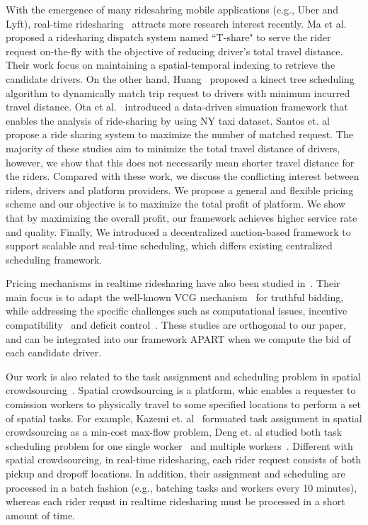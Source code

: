 With the emergence of many ridesahring mobile applications (e.g., Uber and Lyft), real-time ridesharing~\cite{Ma13, Ma15, Huang14,Ota15, Cici15, Cao15, PelzerITS15} attracts more research interest recently. Ma et al.~\cite{Ma13, Ma15} proposed a ridesharing dispatch system named ``T-share" to serve the rider request on-the-fly with the objective of reducing driver's total travel distance. Their work focus on maintaining a spatial-temporal indexing to retrieve the candidate drivers. On the other hand, Huang~\cite{Huang14} proposed a kinect tree scheduling algorithm to dynamically match trip request to drivers with minimum incurred travel distance. Ota et al.~\cite{Ota15} introduced a data-driven simuation framework that enables the analysis of ride-sharing by using NY taxi dataset. Santos et. al~\cite{SantosIjcai13} propose a ride sharing system to maximize the number of matched request. The majority of these studies aim to minimize the total travel distance of drivers, however, we show that this does not necessarily mean shorter travel distance for the riders. Compared with these work, we discuss the conflicting interest between riders, drivers and platform providers. We propose a general and flexible pricing scheme and  our objective is to maximize the total profit of platform. We show that by maximizing the overall profit, our framework achieves higher service rate and quality.  Finally, We introduced a decentralized auction-based framework to support scalable and real-time scheduling, which differs existing centralized scheduling framework. 

Pricing mechanisms in realtime ridesharing have also been studied in~\cite{KamarIJCAI09,KleinerIJCAI11, ZhaoAAMAS14}. Their main focus is to adapt the well-known VCG mechanism~\cite{Nisan07} for truthful bidding, while addressing the specific challenges such as computational issues, incentive compatibility~\cite{KamarIJCAI09, KleinerIJCAI11} and deficit control~\cite{ZhaoAAMAS14}. These studies are orthogonal to our paper, and can be integrated into our framework APART when we compute the bid of each candidate driver. 

Our work is also related to the task assignment and scheduling problem in spatial crowdsourcing~\cite{KazemiGis12, DengGis13, DengGis15}. Spatial crowdsourcing is a platform, whic enables a requester to comission workers to physically travel to some specified locations to perform a set of spatial tasks. For example, Kazemi et. al~\cite{KazemiGis12} formuated task assignment in spatial crowdsourcing as a min-cost max-flow problem, Deng et. al studied both task scheduling problem for one single worker~\cite{DengGis13} and multiple workers~\cite{DengGis15}. Different with spatial crowdsourcing, in real-time ridesharing, each rider request consists of both pickup and dropoff locations. In addition, their assignment and scheduling are processed in a batch fashion (e.g., batching tasks and workers every 10 minutes), whereas each rider requst in realtime ridesharing must be processed in a short amount of time.
